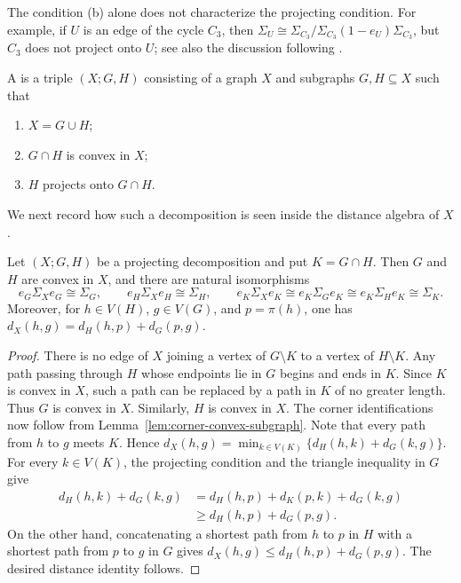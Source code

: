 \documentclass[a4paper,leqno]{amsart}
\begin{document}
\begin{rmk}\label{rmk:quotient-not-projecting}
The condition (b) alone does not characterize the projecting condition.  For example, if $U$ is an edge of the cycle $C_3$, then $\Sigma_U\cong\Sigma_{C_3}/\Sigma_{C_3}(1-e_U)\Sigma_{C_3}$, but
$C_3$ does not project onto $U$; see also the discussion following 
\cite[Definition~6.2]{HW17}.
\end{rmk}

\begin{dfn}\label{def:projecting-decomposition}
A  is a triple $(X;G,H)$ consisting
of a graph $X$ and subgraphs $G,H\subseteq X$ such that
\begin{enumerate}
    \item $X=G\cup H$;
    \item $G\cap H$ is convex in $X$;
    \item $H$ projects onto $G\cap H$.
\end{enumerate}
\end{dfn}

We next record how such a decomposition is seen inside the distance
algebra of $X$.

\begin{prop}\label{prop:projecting-decomposition-algebra}
Let $(X;G,H)$ be a projecting decomposition and put $K=G\cap H$.
Then $G$ and $H$ are convex in $X$, and there are natural isomorphisms
\[
e_G\Sigma_Xe_G\cong\Sigma_G,
\qquad
e_H\Sigma_Xe_H\cong\Sigma_H,
\qquad
e_K\Sigma_Xe_K
\cong
e_K\Sigma_Ge_K
\cong
e_K\Sigma_He_K
\cong
\Sigma_K.
\]
Moreover, for $h\in V(H)$, $g\in V(G)$, and $p=\pi(h)$, one has
$d_X(h,g)=d_H(h,p)+d_G(p,g).$
\end{prop}

\begin{proof}
There is no edge of $X$ joining a vertex of $G\setminus K$ to a
vertex of $H\setminus K$. Any path passing through $H$ whose
endpoints lie in $G$ begins and ends in $K$. Since $K$ is
convex in $X$, such a path can be replaced by a path in $K$ of
no greater length. Thus $G$ is convex in $X$. Similarly, $H$ is convex in $X$. The corner identifications now follow from
Lemma~\ref{lem:corner-convex-subgraph}. Note that every path from $h$ to $g$ meets $K$. Hence
$d_X(h,g)= \min_{k\in V(K)}
\bigl\{d_H(h,k)+d_G(k,g)\bigr\}$.
For every $k\in V(K)$, the projecting condition and the triangle
inequality in $G$ give
\[
\begin{aligned}
d_H(h,k)+d_G(k,g)
&=
d_H(h,p)+d_K(p,k)+d_G(k,g)\\
&\geq
d_H(h,p)+d_G(p,g).
\end{aligned}
\]
On the other hand, concatenating a shortest path from $h$ to $p$ in
$H$ with a shortest path from $p$ to $g$ in $G$ gives
$d_X(h,g)\leq d_H(h,p)+d_G(p,g)$. The desired distance identity follows.
\end{proof}
\end{document}

